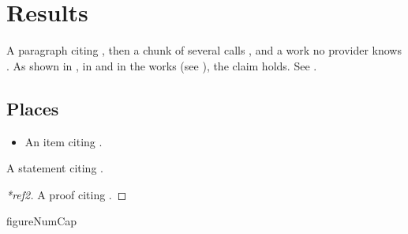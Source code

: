 \flmHeading[toc=true]
\section{Results \flmCitePreSpace{}}{\flmLabels{\label{ref1}}}

A paragraph citing \flmCitePreSpace{}, then a chunk of several calls \flmCitePreSpace{}, and a work no provider knows \flmCitePreSpace{}. As shown in , in  and in the works (see ), the claim holds. See .

\flmHeading[toc=true]
\subsection{Places}{\flmLabels{}}

\begin{itemize}
\item An item citing \flmCitePreSpace{}.
\end{itemize}

\begin{theorem}\flmLabels{\label{ref2}}
A statement citing \flmCitePreSpace{}.
\end{theorem}

\begin{proof}[*ref2]
A proof citing \flmCitePreSpace{}.
\end{proof}

\begin{quote}
\end{quote}

\begin{flmFloat}{figure}{NumCap}

\caption{A caption citing \flmCitePreSpace{}}\flmLabels{\label{ref3}}\end{flmFloat}

